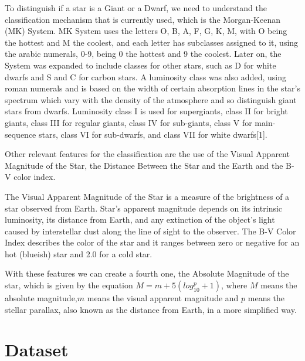 \documentclass[conference]{IEEEtran}
\begin{document}
\par To distinguish if a star is a Giant or a Dwarf, we need to understand the classification mechanism that is currently used, which is the Morgan-Keenan (MK) System. MK System uses the letters O, B, A, F, G, K, M, with O being the hottest and M the coolest, and each letter has subclasses assigned to it, using the arabic numerals, 0-9, being 0 the hottest and 9 the coolest. Later on, the System was expanded to include classes for other stars, such as D for white dwarfs and S and C for carbon stars. A luminosity class was also added, using roman numerals and is based on the width of certain absorption lines in the star’s spectrum which vary with the density of the atmosphere and so distinguish giant stars from dwarfs. Luminosity class I is used for supergiants, class II for bright giants, class III for regular giants, class IV for sub-giants, class V for main-sequence stars, class VI for sub-dwarfs, and class VII for white dwarfs[1]. 
\par Other relevant features for the classification are the use of the Visual Apparent Magnitude of the Star, the Distance Between the Star and the Earth and the B-V color index. \par The Visual Apparent Magnitude of the Star is a measure of the brightness of a star observed from Earth. Star's apparent magnitude depends on its intrinsic luminosity, its distance from Earth, and any extinction of the object's light caused by interstellar dust along the line of sight to the observer. The B-V Color Index describes the color of the star and it ranges between zero or negative for an hot (blueish) star and 2.0 for a cold star. 
\par With these features we can create a fourth one, the Absolute Magnitude of the star, which is given by the equation \( M = m + 5(log_{10}^p+1) \), where \( M \) means the absolute magnitude,\( m \) means the visual apparent magnitude and \( p \) means the stellar parallax, also known as the distance from Earth, in a more simplified way.  


\section{Dataset}
\end{document}
